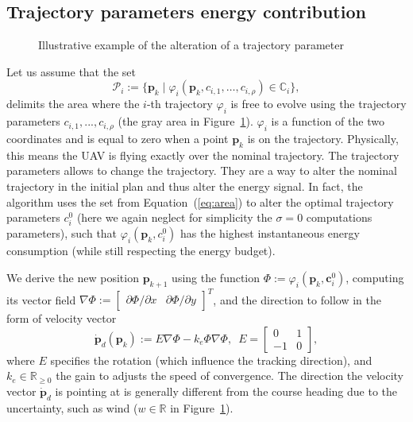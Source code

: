 \documentclass[letterpaper,10pt,conference]{ieeeconf}
\newcommand{\figpath}{./figures}
\theoremstyle{definition}
\begin{document}
\subsection{Trajectory parameters energy contribution}
\label{sec:model}

\begin{figure}[h]
  \centering
  
  \caption{Illustrative example of the alteration of a trajectory parameter}
  \label{fig:tee1}
\end{figure}

Let us assume that the set
\begin{equation}\label{eq:area}
  \mathcal{P}_i:=\{\mathbf{p}_k\mid\varphi_i(\mathbf{p}_k,c_{i,1},\dots,c_{i,\rho})\in\mathbb{C}_i\},
\end{equation}
delimits the area where the $i$-th trajectory $\varphi_i$ is free to evolve using the trajectory parameters $c_{i,1},...,c_{i,\rho}$ (the gray area in Figure~\ref{fig:tee1}). $\varphi_i$ is a function of the two coordinates and is equal to zero when a point $\mathbf{p}_k$ is on the trajectory. Physically, this means the UAV is flying exactly over the nominal trajectory. The trajectory parameters allows to change the trajectory. They are a way to alter the nominal trajectory in the initial plan and thus alter the energy signal.
In fact, the algorithm uses the set from Equation~(\ref{eq:area}) to alter the optimal trajectory parameters $c_i^0$ (here we again neglect for simplicity the $\sigma=0$ computations parameters), such that $\varphi_i(\mathbf{p}_k,c_i^0)$ has the highest instantaneous energy consumption (while still respecting the energy budget). 

We derive the new position $\mathbf{p}_{k+1}$ using the function $\varPhi:=\varphi_i(\mathbf{p}_k,\mathbf{c}_i^0)$, computing its vector field $\nabla\varPhi:=\begin{bmatrix}\partial\varPhi/\partial x & \partial\varPhi/\partial y\end{bmatrix}^T$, and the direction to follow in the form of velocity vector~\cite{de2017guidance}
\begin{equation}\label{eq:pd}
  \dot{\mathbf{p}}_d(\mathbf{p}_k):=E\nabla\varPhi-k_e\varPhi\nabla\varPhi,\,\,\,E=\begin{bmatrix}
    0&1\\-1&0
  \end{bmatrix},
\end{equation}
where $E$ specifies the rotation (which influence the tracking direction), and $k_e\in\mathbb{R}_{\geq 0}$ the gain to adjusts the speed of convergence. The direction the velocity vector $\dot{\mathbf{p}}_d$ is pointing at is generally different from the course heading due to the uncertainty, such as wind ($w\in\mathbb{R}$ in Figure~\ref{fig:tee1}).
\end{document}
